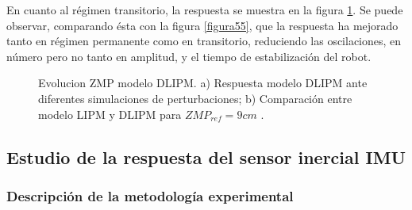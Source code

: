 En cuanto al régimen transitorio, la respuesta se muestra en la figura \ref{figura514}. Se puede observar, comparando ésta con la figura \ref{figura55}, que la respuesta ha mejorado tanto en régimen permanente como en transitorio, reduciendo las oscilaciones, en número pero no tanto en amplitud, y el tiempo de estabilización del robot.

\begin{figure}[H]
\centering
{}
\quad
{}
\caption{Evolucion ZMP modelo DLIPM. a) Respuesta modelo DLIPM ante diferentes simulaciones de perturbaciones; b) Comparación entre modelo LIPM y DLIPM para $ZMP_{ref} = 9 cm$ \cite{ref21}.}
\label{figura514}
\end{figure}

\subsection{Estudio de la respuesta del sensor inercial IMU}\label{respuestaIMU}

\subsubsection{Descripción de la metodología experimental}

